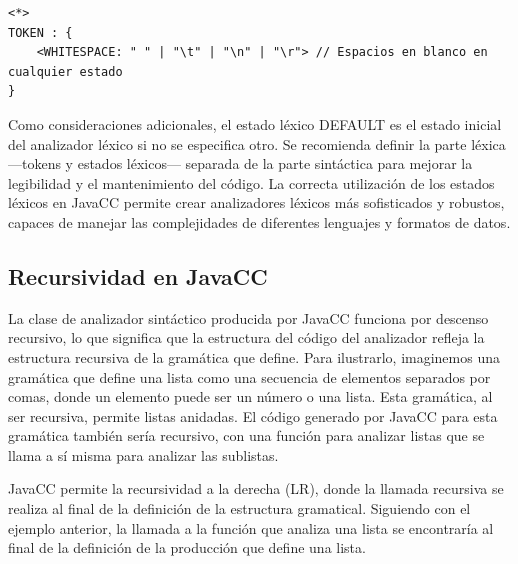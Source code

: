 \lstset{inputencoding=utf8/latin1}
\begin{lstlisting}
<*>
TOKEN : {
	<WHITESPACE: " " | "\t" | "\n" | "\r"> // Espacios en blanco en cualquier estado
}
\end{lstlisting}

Como consideraciones adicionales, el estado léxico DEFAULT es el estado inicial del analizador léxico si no se especifica otro.
Se recomienda definir la parte léxica ---tokens y estados léxicos--- separada de la parte sintáctica para mejorar la legibilidad y el mantenimiento del código.
La correcta utilización de los estados léxicos en JavaCC permite crear analizadores léxicos más sofisticados y robustos, capaces de manejar las complejidades de diferentes lenguajes y formatos de datos.

\subsection{Recursividad en JavaCC}



\noindent La clase de analizador sintáctico producida por JavaCC funciona por descenso recursivo, lo que significa que la estructura del código del analizador refleja la estructura recursiva de la gramática que define. Para ilustrarlo, imaginemos una gramática que define una lista como una secuencia de elementos separados por comas, donde un elemento puede ser un número o una lista. Esta gramática, al ser recursiva, permite listas anidadas. El código generado por JavaCC para esta gramática también sería recursivo, con una función para analizar listas que se llama a sí misma para analizar las sublistas.

JavaCC permite la recursividad a la derecha (LR), donde la llamada recursiva se realiza al final de la definición de la estructura gramatical. Siguiendo con el ejemplo anterior, la llamada a la función que analiza una lista se encontraría al final de la definición de la producción que define una lista.

